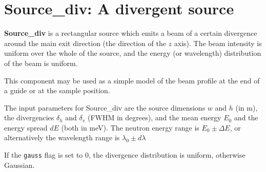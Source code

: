 \section{Source\_div: A divergent source}
\label{source-div}


{\bf Source\_div} is a rectangular source which emits a
beam of a certain divergence around the main exit direction
(the direction of the $z$ axis).
The beam intensity is uniform over
the whole of the source, and the energy (or wavelength) distribution
of the beam is uniform.

This component may be used as a simple model of the
beam profile at the end of a guide or at the sample
position.

The input parameters for Source\_div are the source dimensions
$w$ and $h$ (in m), the divergencies $\delta_h$ and $\delta_v$ (FWHM in degrees),
and the mean energy $E_0$ and the energy spread $dE$ (both in meV).
The neutron energy range is $E_0 \pm \Delta E$, or alternatively
the wavelength range is $\lambda_0 \pm d\lambda$

If the \verb+gauss+ flag is set to 0, the divergence distribution is uniform, 
otherwise Gaussian.

